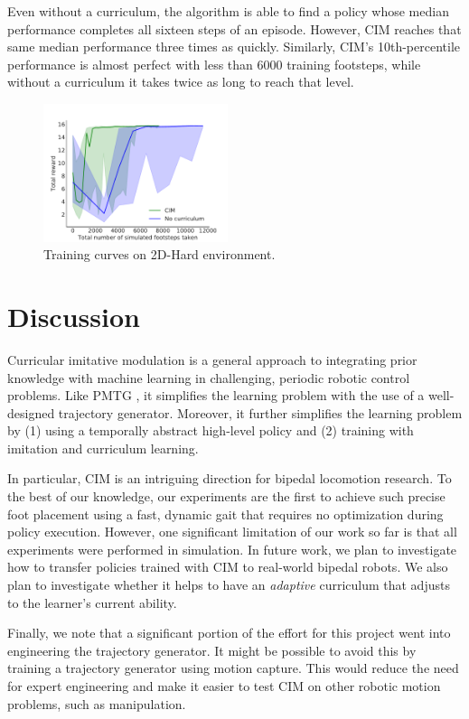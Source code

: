 \documentclass[conference]{IEEEtran}
\begin{document}
Even without a curriculum, the algorithm is able to find a policy whose median performance completes all sixteen steps of an episode.
However, CIM reaches that same median performance three times as quickly.
Similarly, CIM's 10th-percentile performance is almost perfect with less than 6000 training footsteps, while without a curriculum it takes twice as long to reach that level.

\begin{figure}
  \includegraphics[width=0.48\textwidth]{../figures/nocur_baseline.pdf}
  \caption{\label{fig:nocur baseline} Training curves on 2D-Hard environment.}
\end{figure}

\section{Discussion}

Curricular imitative modulation is a general approach to integrating prior knowledge with machine learning in challenging, periodic robotic control problems.
Like PMTG \citep{iscen2018pmtg}, it simplifies the learning problem with the use of a well-designed trajectory generator.
Moreover, it further simplifies the learning problem by (1) using a temporally abstract high-level policy and (2) training with imitation and curriculum learning.

In particular, CIM is an intriguing direction for bipedal locomotion research.
To the best of our knowledge, our experiments are the first to achieve such precise foot placement
using a fast, dynamic gait that requires no optimization during policy execution.
However, one significant limitation of our work so far is that all experiments were performed in simulation.
In future work, we plan to investigate how to transfer policies trained with CIM to real-world bipedal robots.
We also plan to investigate whether it helps to have an \emph{adaptive} curriculum that adjusts to the learner's current ability.

Finally, we note that a significant portion of the effort for this project went into engineering the trajectory generator.
It might be possible to avoid this by training a trajectory generator using motion capture.
This would reduce the need for expert engineering and make it easier to test CIM on other robotic motion problems, such as manipulation.
\end{document}

